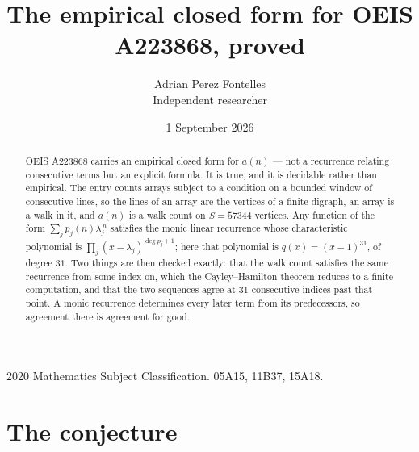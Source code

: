 \documentclass[11pt,a4paper]{article}
\title{The empirical closed form for OEIS A223868, proved}
\author{Adrian Perez Fontelles\\ \small Independent researcher}
\date{1 September 2026}
\theoremstyle{plain}
\theoremstyle{definition}
\begin{document}
\maketitle

\begin{abstract}
OEIS A223868 carries an empirical closed form for $a(n)$ --- not a recurrence relating
consecutive terms but an explicit formula. It is true, and it is decidable rather than
empirical. The entry counts arrays subject to a condition on a bounded window of consecutive lines, so the lines of an array are the
vertices of a finite digraph, an array is a walk in it, and $a(n)$ is a walk count on
$S=57344$ vertices. Any function of the form $\sum_j p_j(n)\lambda_j^{\,n}$ satisfies the
monic linear recurrence whose characteristic polynomial is
$\prod_j(x-\lambda_j)^{\deg p_j+1}$; here that polynomial is $q(x)=(x-1)^{31}$, of degree
$31$. Two things are then checked exactly: that the walk count satisfies the same
recurrence from some index on, which the Cayley--Hamilton theorem reduces to a finite
computation, and that the two sequences agree at $31$ consecutive indices past that
point. A monic recurrence determines every later term from its predecessors, so agreement
there is agreement for good.
\end{abstract}

\noindent\small 2020 Mathematics Subject Classification. 05A15, 11B37, 15A18.\normalsize

\section{The conjecture}
\end{document}
